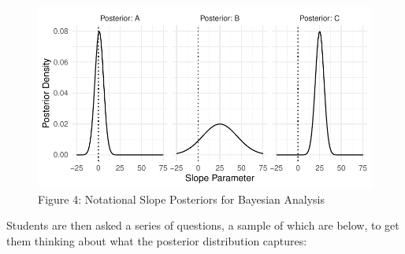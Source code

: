 \documentclass[
  12pt,
  letterpaper,
  DIV=11,
  numbers=noendperiod]{scrartcl}
\begin{document}
\begin{figure}[H]

{\centering \includegraphics{ps-psci-manuscript_files/figure-pdf/notional-posteriors-1.pdf}

}

\caption{Figure 4: Notational Slope Posteriors for Bayesian Analysis}

\end{figure}

Students are then asked a series of questions, a sample of which are
below, to get them thinking about what the posterior distribution
captures:
\end{document}
